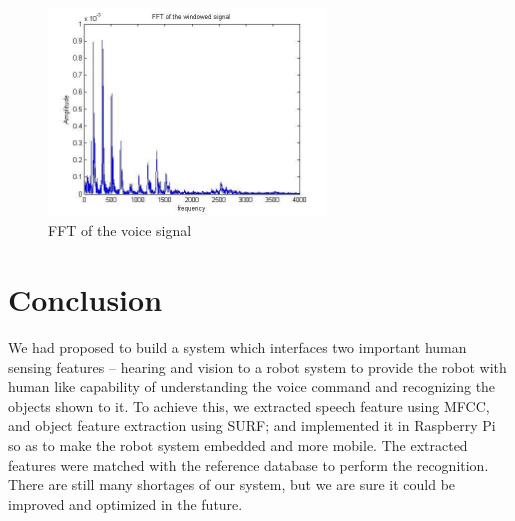 \documentclass[journal,twoside]{IEEEtran}
\begin{document}
\begin{figure}[htbp]
\centering
\includegraphics[width=2.9in]{figure12}
\caption{FFT of the voice signal}
\label{fig:figure12}
\end{figure}

\section{Conclusion}
We had proposed to build a system which interfaces two
important human sensing features – hearing and vision to a
robot system to provide the robot with human like capability
of understanding the voice command and recognizing the
objects shown to it. To achieve this, we extracted speech
feature using MFCC, and object feature extraction using
SURF; and implemented it in Raspberry Pi so as to make the
robot system embedded and more mobile. The extracted
features were matched with the reference database to perform
the recognition. There are still many shortages of our system,
but we are sure it could be improved and optimized in the
future.



%
%
\end{document}
